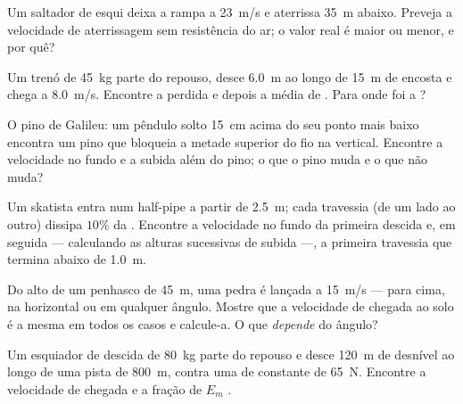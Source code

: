 \begin{exercise}[$\star\star$]\label{exo:g11:mechanical-energy:9}
Um saltador de esqui deixa a rampa a \qty{23}{m/s} e aterrissa
\qty{35}{m} abaixo. Preveja a velocidade de aterrissagem sem resistência
do ar; o valor real é maior ou menor, e por quê?
\end{exercise}

\begin{exercise}[$\star\star$]\label{exo:g11:mechanical-energy:10}
Um trenó de \qty{45}{kg} parte do repouso, desce \qty{6.0}{m} ao longo de
\qty{15}{m} de encosta e chega a \qty{8.0}{m/s}. Encontre a  perdida e depois a  média de . Para onde foi a
?
\end{exercise}

\begin{exercise}[$\star\star$]\label{exo:g11:mechanical-energy:11}
O pino de Galileu: um pêndulo solto \qty{15}{cm} acima do seu ponto mais
baixo encontra um pino que bloqueia a metade superior do fio na vertical.
Encontre a velocidade no fundo e a subida além do pino; o que o pino muda
e o que não muda?
\end{exercise}

\begin{exercise}[$\star\star\star$]\label{exo:g11:mechanical-energy:12}
Um skatista entra num half-pipe a partir de \qty{2.5}{m}; cada travessia
(de um lado ao outro) dissipa $10\%$ da . Encontre a
velocidade no fundo da primeira descida e, em seguida --- calculando as
alturas sucessivas de subida ---, a primeira travessia que termina abaixo
de \qty{1.0}{m}.
\end{exercise}

\begin{exercise}[$\star\star\star$]\label{exo:g11:mechanical-energy:13}
Do alto de um penhasco de \qty{45}{m}, uma pedra é lançada a
\qty{15}{m/s} --- para cima, na horizontal ou em qualquer ângulo. Mostre
que a velocidade de chegada ao solo é a mesma em todos os casos e
calcule-a. O que \emph{depende} do ângulo?
\end{exercise}

\begin{exercise}[$\star\star\star$]\label{exo:g11:mechanical-energy:14}
Um esquiador de descida de \qty{80}{kg} parte do repouso e desce
\qty{120}{m} de desnível ao longo de uma pista de \qty{800}{m}, contra
uma  de  constante de \qty{65}{N}. Encontre a velocidade de
chegada e a fração de $E_m$ .
\end{exercise}

